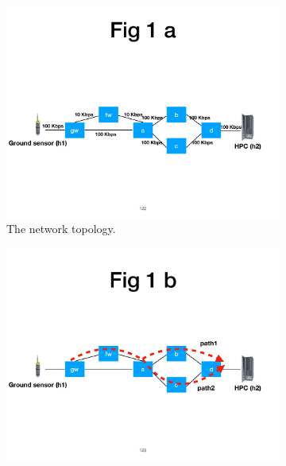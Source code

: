 


\begin{figure}[!htbp]
\centering
\begin{subfigure}{0.8\linewidth}
      \centering\includegraphics[width=\linewidth]{figures/ss-122.pdf}
      \caption{\label{fig:fw-topo} \small The network topology.}
\end{subfigure}
\hspace{0.03\linewidth}
\begin{subfigure}{0.8\linewidth}
      \centering\includegraphics[width=\linewidth]{figures/ss-123.pdf}

\end{subfigure}
\end{figure}
